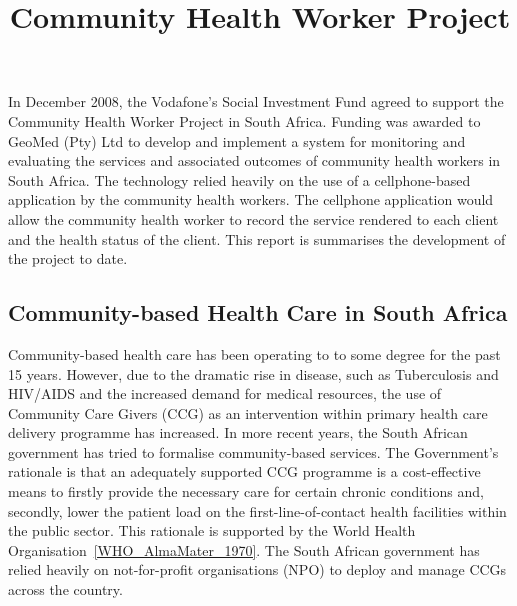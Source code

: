 \title{Community Health Worker Project}
\maketitle

In December 2008, the Vodafone's Social Investment Fund agreed to support 
the Community Health Worker Project in South Africa. Funding was awarded to 
GeoMed (Pty) Ltd to develop and implement a system for 
monitoring and evaluating the services and associated outcomes of community 
health workers in South Africa. The technology relied heavily on the use of 
a cellphone-based application by the community health workers. The cellphone 
application would allow the community health worker to record the service 
rendered to each client and the health status of the client. This report 
is summarises the development of the project to date. 

\subsection*{Community-based Health Care in South Africa}
 
Community-based health care has been operating to to some degree for the 
past 15 years. However, due to the dramatic rise in disease, such as 
Tuberculosis and HIV/AIDS and the increased demand for medical resources, 
the use of Community Care Givers (CCG) as an intervention within primary
health care delivery programme has increased.  In more recent years, 
the South African government has tried to formalise community-based 
services. The Government's rationale is that an adequately supported CCG 
programme is a cost-effective means to firstly provide the necessary 
care for certain chronic conditions and, secondly, lower the patient load 
on the first-line-of-contact health facilities within the public sector. 
This rationale is supported by the World Health 
Organisation~\ref{WHO_AlmaMater_1970}. The South African government has 
relied heavily on not-for-profit organisations (NPO) to deploy and manage 
CCGs across the country.

